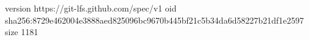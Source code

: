 version https://git-lfs.github.com/spec/v1
oid sha256:8729e462004e3888aed825096bc9670b445bf21c5b34da6d58227b21df1e2597
size 1181
